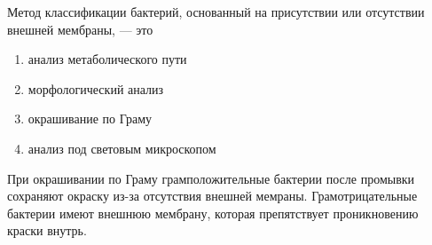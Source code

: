 
Метод классификации бактерий, основанный на присутствии или отсутствии внешней мембраны, — это

\begin{enumerate}
    \item анализ метаболического пути 
    \item морфологический анализ 
    \item окрашивание по Граму 
    \item анализ под световым микроскопом
\end{enumerate}

\explanationSection

При окрашивании по Граму грамположительные бактерии после промывки сохраняют окраску из-за отсутствия внешней мемраны. Грамотрицательные бактерии имеют внешнюю мембрану, которая препятствует проникновению краски внутрь. 

